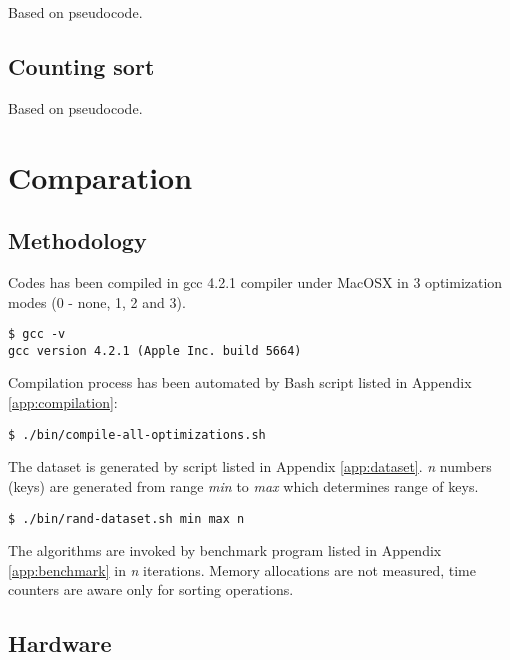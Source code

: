 \documentclass[12pt]{article}
\begin{document}
Based on pseudocode\cite{czech}.



\subsection{Counting sort}

Based on pseudocode\cite{czech}.



\section{Comparation}

\subsection{Methodology}

Codes has been compiled in gcc 4.2.1 compiler under MacOSX in 3 optimization modes (0 - none, 1, 2 and 3)\cite{man-gcc}.

\begin{lstlisting}
$ gcc -v
gcc version 4.2.1 (Apple Inc. build 5664)
\end{lstlisting}

Compilation process has been automated by Bash script listed in Appendix \ref{app:compilation}:

\begin{lstlisting}
$ ./bin/compile-all-optimizations.sh
\end{lstlisting}

The dataset is generated by script listed in Appendix \ref{app:dataset}. \emph{n} numbers (keys) are generated from range \emph{min} to \emph{max} which determines range of keys.

\begin{lstlisting}
$ ./bin/rand-dataset.sh min max n
\end{lstlisting}

The algorithms are invoked by benchmark program listed in Appendix \ref{app:benchmark} in \emph{n} iterations. Memory allocations are not measured, time counters are aware only for sorting operations.

\subsection{Hardware}
\end{document}
